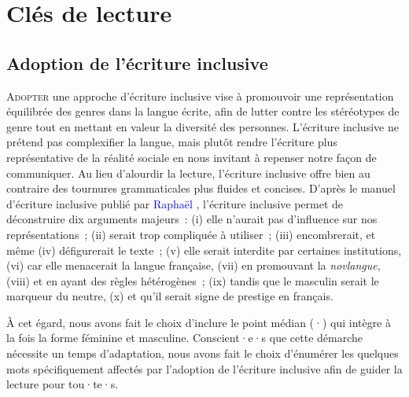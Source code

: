
\chapter*{Clés de lecture
    \label{body:guide-lecture-manuscrit}
    }

\section*{Adoption de l'écriture inclusive
    \label{subbody:adoption-ecriture-inclusive}
    }

\lettrine[lines=3, findent=8pt, nindent=0pt]{ A}{dopter} une approche d'écriture inclusive vise à promouvoir une représentation équilibrée des genres dans la langue écrite, afin de lutter contre les stéréotypes de genre tout en mettant en valeur la diversité des personnes. L'écriture inclusive ne prétend pas complexifier la langue, mais plutôt rendre l'écriture plus représentative de la réalité sociale en nous invitant à repenser notre façon de communiquer. Au lieu d'alourdir la lecture, l'écriture inclusive offre bien au contraire des tournures grammaticales plus fluides et concises. D'après le manuel d'écriture inclusive publié par \textcolor{blue}{Raphaël} \textcolor{blue}{\textcite[19-23]{haddad_manuel_2019}}, l'écriture inclusive permet de déconstruire dix arguments majeurs~: (i) elle n'aurait pas d'influence sur nos représentations~; (ii) serait trop compliquée à utiliser~; (iii) encombrerait, et même (iv) défigurerait le texte~; (v) elle serait interdite par certaines institutions, (vi) car elle menacerait la langue française, (vii) en promouvant la \textsl{novlangue}, (viii) et en ayant des règles hétérogènes~; (ix) tandis que le masculin serait le marqueur du neutre, (x) et qu'il serait signe de prestige en français.%

À cet égard, nous avons fait le choix d'inclure le point médian (·) qui intègre à la fois la forme féminine et masculine. Conscient·e·s que cette démarche nécessite un temps d'adaptation, nous avons fait le choix d'énumérer les quelques mots spécifiquement affectés par l'adoption de l'écriture inclusive afin de guider la lecture pour tou·te·s.%

